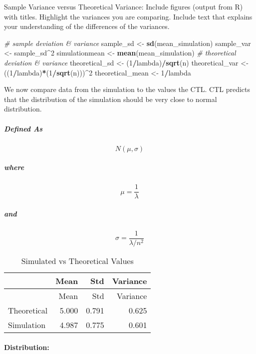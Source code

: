 \documentclass[]{article}
\newenvironment{Shaded}{\begin{snugshade}}{\end{snugshade}}
\newcommand{\CommentTok}[1]{\textcolor[rgb]{0.56,0.35,0.01}{\textit{#1}}}
\newcommand{\DecValTok}[1]{\textcolor[rgb]{0.00,0.00,0.81}{#1}}
\newcommand{\KeywordTok}[1]{\textcolor[rgb]{0.13,0.29,0.53}{\textbf{#1}}}
\newcommand{\NormalTok}[1]{#1}
\newcommand{\OperatorTok}[1]{\textcolor[rgb]{0.81,0.36,0.00}{\textbf{#1}}}
\newcommand{\StringTok}[1]{\textcolor[rgb]{0.31,0.60,0.02}{#1}}
\let\oldparagraph\paragraph
\renewcommand{\paragraph}[1]{\oldparagraph{#1}\mbox{}}
\let\oldsubparagraph\subparagraph
\renewcommand{\subparagraph}[1]{\oldsubparagraph{#1}\mbox{}}
\begin{document}
Sample Variance versus Theoretical Variance: Include figures (output
from R) with titles. Highlight the variances you are comparing. Include
text that explains your understanding of the differences of the
variances.

\begin{Shaded}
\begin{Highlighting}[]
\CommentTok{# sample deviation & variance}
\NormalTok{sample_sd <-}\StringTok{ }\KeywordTok{sd}\NormalTok{(mean_simulation)}
\NormalTok{sample_var <-}\StringTok{ }\NormalTok{sample_sd}\OperatorTok{^}\DecValTok{2}
\NormalTok{simulationmean <-}\StringTok{ }\KeywordTok{mean}\NormalTok{(mean_simulation)}
\CommentTok{# theoretical deviation & variance}
\NormalTok{theoretical_sd <-}\StringTok{ }\NormalTok{(}\DecValTok{1}\OperatorTok{/}\NormalTok{lambda)}\OperatorTok{/}\KeywordTok{sqrt}\NormalTok{(n)}
\NormalTok{theoretical_var <-}\StringTok{ }\NormalTok{((}\DecValTok{1}\OperatorTok{/}\NormalTok{lambda)}\OperatorTok{*}\NormalTok{(}\DecValTok{1}\OperatorTok{/}\KeywordTok{sqrt}\NormalTok{(n)))}\OperatorTok{^}\DecValTok{2}
\NormalTok{theoretical_mean <-}\StringTok{ }\DecValTok{1}\OperatorTok{/}\NormalTok{lambda}
\end{Highlighting}
\end{Shaded}

We now compare data from the simulation to the values the CTL. CTL
predicts that the distribution of the simulation should be very close to
normal distribution.

\hypertarget{defined-as}{%
\subparagraph{Defined As}\label{defined-as}}

\[N(\mu, \sigma)\]

\hypertarget{where}{%
\subparagraph{where}\label{where}}

\[\mu=\frac{1} \lambda\]

\hypertarget{and}{%
\subparagraph{and}\label{and}}

\[\sigma =\frac {1 }{\lambda / n^2} \]

\begin{longtable}[]{@{}lrrr@{}}
\caption{Simulated vs Theoretical Values}\tabularnewline
\toprule
& Mean & Std & Variance\tabularnewline
\midrule
\endfirsthead
\toprule
& Mean & Std & Variance\tabularnewline
\midrule
\endhead
Theoretical & 5.000 & 0.791 & 0.625\tabularnewline
Simulation & 4.987 & 0.775 & 0.601\tabularnewline
\bottomrule
\end{longtable}

\hypertarget{distribution}{%
\paragraph{Distribution:}\label{distribution}}
\end{document}
